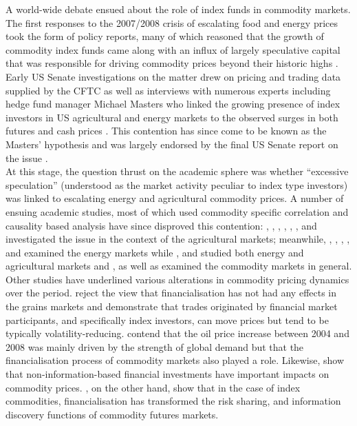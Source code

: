 \documentclass[
  authoryear,
  preprint,
  3p]{elsarticle}
\begin{document}
A world-wide debate ensued about the role of index funds in commodity
markets. The first responses to the 2007/2008 crisis of escalating food
and energy prices took the form of policy reports, many of which
reasoned that the growth of commodity index funds came along with an
influx of largely speculative capital that was responsible for driving
commodity prices beyond their historic highs
\citep{deschutter_food_2010, gilbert_speculative_2010, herman_not_2011, schumann_hunger_2011, unctad_global_2009}.\\
Early US Senate investigations on the matter drew on pricing and trading
data supplied by the CFTC as well as interviews with numerous experts
including hedge fund manager Michael Masters who linked the growing
presence of index investors in US agricultural and energy markets to the
observed surges in both futures and cash prices
\citep{masters_testimony_2008, masters_accidental_2008}. This contention
has since come to be known as the Masters' hypothesis and was largely
endorsed by the final US Senate report on the issue
\citep{senate_excessive_2009}.\\
At this stage, the question thrust on the academic sphere was whether
``excessive speculation'' (understood as the market activity peculiar to
index type investors) was linked to escalating energy and agricultural
commodity prices. A number of ensuing academic studies, most of which
used commodity specific correlation and causality based analysis have
since disproved this contention: \citet{irwin_devil_2009},
\citet{sanders_adequacy_2010}, \citet{sanders_impact_2011},
\citet{sanders_new_2011}, \citet{irwin_commodity_2013},
\citet{brunetti_commodity_2014}, \citet{hamilton_effects_2015} and
\citet{bruno_financialisation_2017} investigated the issue in the
context of the agricultural markets; meanwhile,
\citet{buyuksahin_speculators_2011}, \citet{tokic_speculation_2012},
\citet{fattouh_role_2013}, \citet{kilian_role_2014},
\citet{knittel_simple_2016} and \citet{manera_modeling_2016} examined
the energy markets while \citet{bohl_does_2013}, \citet{kim_does_2015}
and \citet{boyd_prevalence_2016} studied both energy and agricultural
markets and \citet{irwin_index_2011},
\citet{irwin_financialisation_2012} as well as
\citet{stoll_commodity_2011} examined the commodity markets in general.
Other studies have underlined various alterations in commodity pricing
dynamics over the period. \citet{gilbert_role_2014} reject the view that
financialisation has not had any effects in the grains markets and
demonstrate that trades originated by financial market participants, and
specifically index investors, can move prices but tend to be typically
volatility-reducing. \citet{juvenal_speculation_2015} contend that the
oil price increase between 2004 and 2008 was mainly driven by the
strength of global demand but that the financialisation process of
commodity markets also played a role. Likewise,
\citet{henderson_new_2015} show that non-information-based financial
investments have important impacts on commodity prices.
\citet{cheng_financialisation_2014}, on the other hand, show that in the
case of index commodities, financialisation has transformed the risk
sharing, and information discovery functions of commodity futures
markets.
\end{document}
